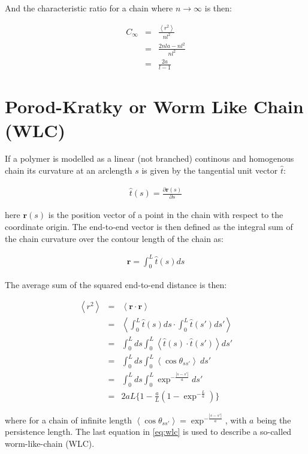 And the characteristic ratio for a chain where $n \to \infty$ is then:

\begin{eqnarray}
C_{\infty} & =  & \frac{\left<r^{2}\right>}{ nl^{2}}\\
          & =  & \frac{2nla - nl^{2}}{nl^{2}}\\
          & =  & \frac{2a}{l-1}
\end{eqnarray}  

\section{Porod-Kratky or Worm Like Chain (WLC)}
If a polymer is modelled as a linear (not branched) continous and
homogenous chain its curvature at an arclength $s$ is given by the
tangential unit vector $\hat{t}$:

\begin{gather}
\hat{t}(s)=\frac{\partial{\textbf{r}(s)}}{\partial{s}}
\end{gather}

here $\textbf{r}(s)$ is the position vector of a point in the chain
with respect to the coordinate origin.
The end-to-end vector is then defined as the integral sum of the chain
curvature over the contour length of the chain as:

\begin{gather}
\textbf{r}=\int_{0}^{L}\hat{t}(s)ds
\end{gather}

The average sum of the squared end-to-end distance is then:

\begin{eqnarray}
\label{eq:wlc}
\left<r^2\right> & = & \left<\textbf{r} \cdot \textbf{r}\right> \nonumber \\
               & = & \left<\int_{0}^{L}\hat{t}(s)ds \cdot \int_{0}^{L}\hat{t}(s')ds' \right>\nonumber \\
               & = & \int_{0}^{L} ds \int_{0}^{L} \left<\hat{t}(s) \cdot \hat{t}(s')\right>ds' \nonumber \\
               & = & \int_{0}^{L} ds \int_{0}^{L} \left<\cos{\theta}_{ss'}\right>~ ds' \nonumber \\
               & = & \int_{0}^{L} ds \int_{0}^{L} \exp^{-\frac{|s-s'|}{a}} ds' \nonumber \\
               & = & 2aL \{ 1 - \frac{a}{L}(1-\exp^{-\frac{L}{a}})\}
\end{eqnarray}

where  for   a  chain  of  infinite   length  $\left<\cos{\theta_{ss'}}\right>  =
\exp^{-\frac{|s-s'|}{a}}$, with $a$ being the persistence length.  The
last   equation  in   \ref{eq:wlc}   is  used   to   describe  a   so-called
worm-like-chain (WLC).


